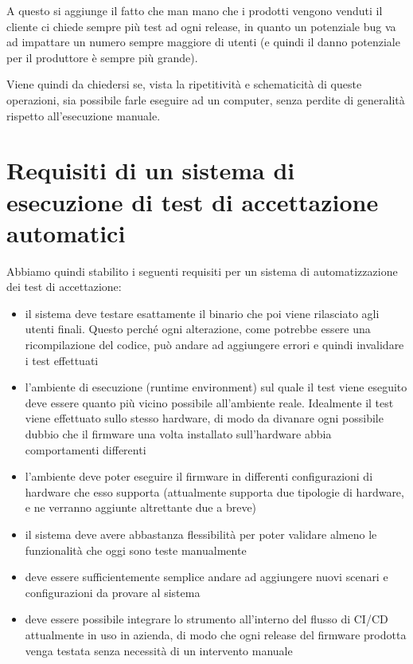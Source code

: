 \documentclass[12pt,a4paper,twoside,titlepage]{book}
\begin{document}
A questo si aggiunge il fatto che man mano che i prodotti vengono venduti il cliente ci 
chiede sempre più test ad ogni release, in quanto un potenziale bug va ad impattare un numero 
sempre maggiore di utenti (e quindi il danno potenziale per il produttore è sempre più grande). 

Viene quindi da chiedersi se, vista la ripetitività e schematicità di queste operazioni,
sia possibile farle eseguire ad un computer, senza perdite di generalità rispetto all'esecuzione 
manuale.

\section{Requisiti di un sistema di esecuzione di test di accettazione automatici}

Abbiamo quindi stabilito i seguenti requisiti per un sistema di automatizzazione dei test di 
accettazione:

\begin{itemize}
    \item il sistema deve testare esattamente il binario che poi viene rilasciato agli utenti finali. 
        Questo perché ogni alterazione, come potrebbe essere una ricompilazione del codice, può andare 
        ad aggiungere errori e quindi invalidare i test effettuati
    \item l'ambiente di esecuzione (runtime environment) sul quale il test viene eseguito deve essere quanto 
        più vicino possibile all'ambiente reale. Idealmente il test viene effettuato sullo stesso hardware, 
        di modo da divanare ogni possibile dubbio che il firmware una volta installato sull'hardware abbia 
        comportamenti differenti
    \item l'ambiente deve poter eseguire il firmware in differenti configurazioni di hardware che esso supporta
        (attualmente supporta due tipologie di hardware, e ne verranno aggiunte altrettante due a breve)
    \item il sistema deve avere abbastanza flessibilità per poter validare almeno le funzionalità che oggi 
        sono teste manualmente
    \item deve essere sufficientemente semplice andare ad aggiungere nuovi scenari e configurazioni da provare al sistema
    \item deve essere possibile integrare lo strumento all'interno del flusso di CI/CD attualmente in 
        uso in azienda, di modo che ogni release del firmware prodotta venga testata senza necessità di 
        un intervento manuale
\end{itemize}
\end{document}
